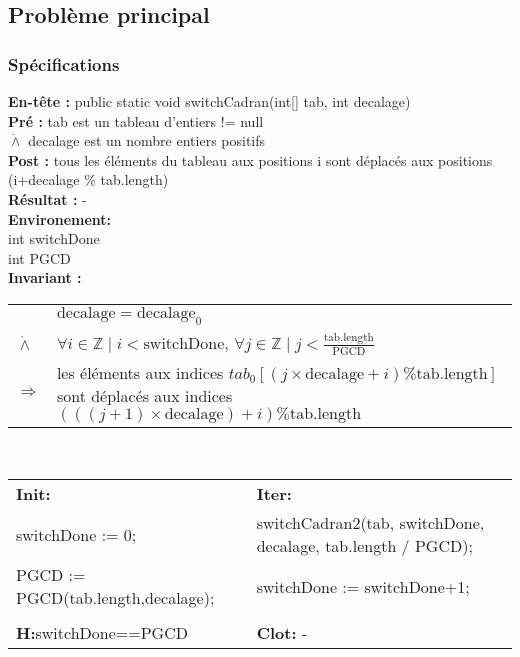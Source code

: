 \subsection{Problème principal}
\subsubsection*{Spécifications}
\noindent \textbf{En-tête :} public static void switchCadran(int[] tab, int decalage)\\
\noindent \textbf{Pré :} tab est un tableau d'entiers != null\\
\indent $\dot{\wedge}$ decalage est un nombre entiers positifs\\
\textbf{Post :} tous les éléments du tableau aux positions i sont déplacés aux positions (i+decalage \% tab.length)\\
\textbf{Résultat :} - \\

\noindent \textbf{Environement: }\\
int switchDone\\
int PGCD\\

\noindent \textbf{Invariant :}

\begin{tabular}{lp{14cm}}

& $\mathrm{decalage}=\mathrm{decalage}_{0}$ \\
$\dot{\wedge}$ & $\forall i \in \mathbb{Z} \mid i < \mathrm{switchDone} $, $\forall j \in \mathbb{Z} \mid j < \frac{\mathrm{tab.length}}{\mathrm{PGCD}}$ \\
$\Rightarrow$ & les éléments aux indices $tab_{0}[(j \times \mathrm{decalage} + i) \% \mathrm{tab.length}]$ sont déplacés aux indices $(((j+1)\times \mathrm{decalage})+i) \% \mathrm{tab.length}$ \\
\end{tabular}\\

\noindent \begin{tabular}{ll}
\textbf{Init: } & \textbf{Iter: }\\
switchDone := 0; & switchCadran2(tab, switchDone, decalage, tab.length / PGCD); \\
PGCD := PGCD(tab.length,decalage); & switchDone := switchDone+1;\\
 & \\
\textbf{H:}switchDone==PGCD & \textbf{Clot: } -\\
\end{tabular}\\

